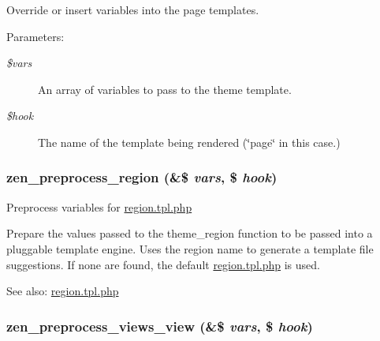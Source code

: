 Override or insert variables into the page templates.

\begin{Desc}
\item[Parameters:]
\begin{description}
\item[{\em \$vars}]An array of variables to pass to the theme template. \item[{\em \$hook}]The name of the template being rendered (\char`\"{}page\char`\"{} in this case.) \end{description}
\end{Desc}
\hypertarget{sites_2all_2themes_2zen_2template_8php_1fa9b7695fa6d89f176bb01c32ad837f}{
\subsubsection[{zen\_\-preprocess\_\-region}]{\setlength{\rightskip}{0pt plus 5cm}zen\_\-preprocess\_\-region (\&\$ {\em vars}, \/  \$ {\em hook})}}
\label{sites_2all_2themes_2zen_2template_8php_1fa9b7695fa6d89f176bb01c32ad837f}


Preprocess variables for \hyperlink{region_8tpl_8php}{region.tpl.php}

Prepare the values passed to the theme\_\-region function to be passed into a pluggable template engine. Uses the region name to generate a template file suggestions. If none are found, the default \hyperlink{region_8tpl_8php}{region.tpl.php} is used.

\begin{Desc}
\item[See also:]\hyperlink{region_8tpl_8php}{region.tpl.php} \end{Desc}
\hypertarget{sites_2all_2themes_2zen_2template_8php_0b913a3a96d6f2f6e457cbf08197e9cc}{
\subsubsection[{zen\_\-preprocess\_\-views\_\-view}]{\setlength{\rightskip}{0pt plus 5cm}zen\_\-preprocess\_\-views\_\-view (\&\$ {\em vars}, \/  \$ {\em hook})}}
\label{sites_2all_2themes_2zen_2template_8php_0b913a3a96d6f2f6e457cbf08197e9cc}


